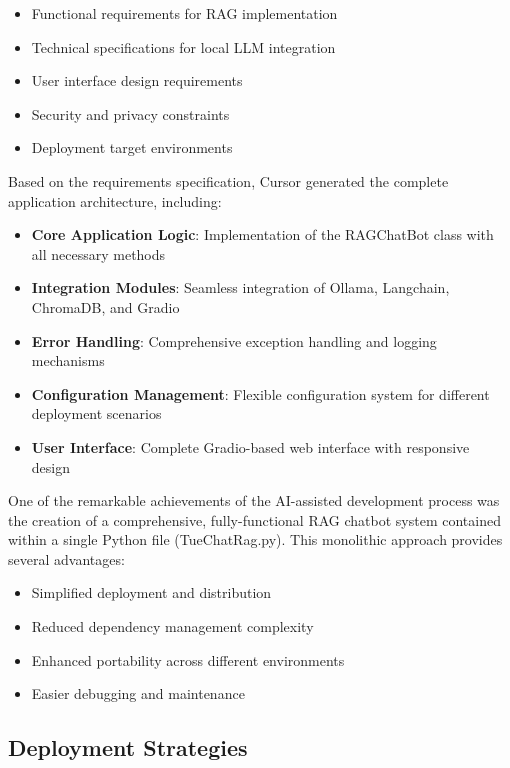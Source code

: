 \documentclass[12pt,letterpaper]{article}
\begin{document}
\begin{itemize}
    \item Functional requirements for RAG implementation
    \item Technical specifications for local LLM integration
    \item User interface design requirements
    \item Security and privacy constraints
    \item Deployment target environments
\end{itemize}

Based on the requirements specification, Cursor generated the complete application architecture, including:

\begin{itemize}
    \item \textbf{Core Application Logic}: Implementation of the RAGChatBot class with all necessary methods
    \item \textbf{Integration Modules}: Seamless integration of Ollama, Langchain, ChromaDB, and Gradio
    \item \textbf{Error Handling}: Comprehensive exception handling and logging mechanisms
    \item \textbf{Configuration Management}: Flexible configuration system for different deployment scenarios
    \item \textbf{User Interface}: Complete Gradio-based web interface with responsive design
\end{itemize}

One of the remarkable achievements of the AI-assisted development process was the creation of a comprehensive, fully-functional RAG chatbot system contained within a single Python file (TueChatRag.py). This monolithic approach provides several advantages:

\begin{itemize}
    \item Simplified deployment and distribution
    \item Reduced dependency management complexity
    \item Enhanced portability across different environments
    \item Easier debugging and maintenance
\end{itemize}

\subsection{Deployment Strategies}
\end{document}
